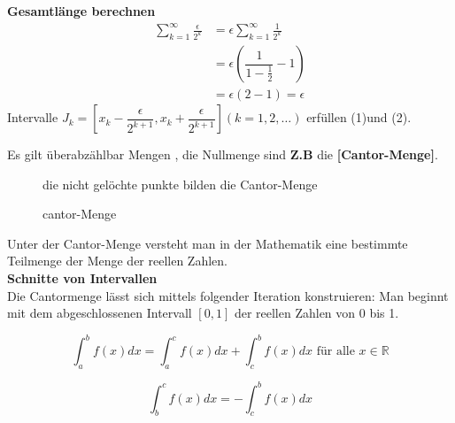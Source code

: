 \textbf{Gesamtlänge berechnen}
\begin{align*}
\sum_{k=1}^{\infty}{\frac{\epsilon}{2^k}} &= \epsilon \sum_{k=1}^{\infty}{\frac{1}{2^k}}\\
&= \epsilon (\dfrac{1}{1-\frac{1}{2}}-1)\\
&= \epsilon(2-1)= \epsilon
\end{align*}
Intervalle $J_k = [x_k - \dfrac{\epsilon}{2^{k+1}}, x_k + \dfrac{\epsilon}{2^{k+1}}](k=1,2,\dots)$ erfüllen (1)und (2).
\begin{remark}
Es gilt überabzählbar Mengen , die Nullmenge sind \textbf{Z.B} die \textbf{[Cantor-Menge]}.

\begin{figure}
	
\centering
{}
	\caption{cantor-Menge}
	die nicht gelöchte punkte bilden die Cantor-Menge
\end{figure}


\end{remark}
\begin{definition}
Unter der Cantor-Menge versteht man in der Mathematik eine bestimmte Teilmenge der Menge der reellen Zahlen.\\
\textbf{Schnitte von Intervallen}\\
Die Cantormenge lässt sich mittels folgender Iteration konstruieren:
Man beginnt mit dem abgeschlossenen Intervall $[0,1]$ der reellen Zahlen von 0 bis 1. 
\end{definition}
\[ \int_{a}^{b} f(x) dx = \int_{a}^{c} f(x) dx + \int_{c}^{b} f(x) dx \text{ für alle } x \in \mathbb{R} \]
\begin{definition}
$$ \int_{b}^{c} f(x) dx = - \int_{c}^{b} f(x) dx $$ 
\end{definition}
